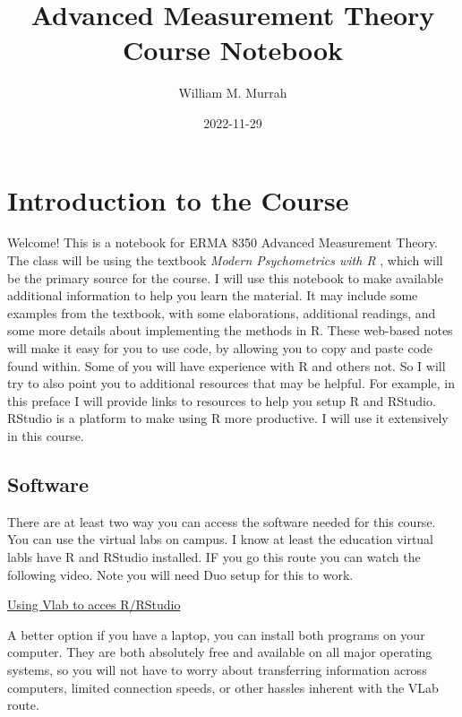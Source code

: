 \documentclass[
]{book}
\title{Advanced Measurement Theory Course Notebook}
\author{William M. Murrah}
\date{2022-11-29}
\begin{document}
\maketitle

{
\setcounter{tocdepth}{1}
\tableofcontents
}
\hypertarget{introduction-to-the-course}{%
\chapter*{Introduction to the Course}\label{introduction-to-the-course}}

Welcome!
This is a notebook for ERMA 8350 Advanced Measurement Theory.
The class will be using the textbook \emph{Modern Psychometrics with R} \citep{mair2018modern}, which will be the primary source for the course.
I will use this notebook to make available additional information to help you learn the material.
It may include some examples from the textbook, with some elaborations, additional readings, and some more details about implementing the methods in R.
These web-based notes will make it easy for you to use code, by allowing you to copy and paste code found within.
Some of you will have experience with R and others not.
So I will try to also point you to additional resources that may be helpful.
For example, in this preface I will provide links to resources to help you setup R and RStudio.
RStudio is a platform to make using R more productive.
I will use it extensively in this course.

\hypertarget{software}{%
\section*{Software}\label{software}}

There are at least two way you can access the software needed for this course.
You can use the virtual labs on campus.
I know at least the education virtual labls have R and RStudio installed.
IF you go this route you can watch the following video.
Note you will need Duo setup for this to work.

\href{https://nv.instructuremedia.com/fetch/QkFoYkIxc0hhUVNIRGFrSE1Hd3JCeWhUREdFPS0tZjk4ODFlYWEyZWFiNWQwYWYyZDk0YTZjMjljZTJlMjBkNmIwMzE5Yw.mp4}{Using Vlab to acces R/RStudio}

A better option if you have a laptop, you can install both programs on your computer.
They are both absolutely free and available on all major operating systems, so you will not have to worry about transferring information across computers, limited connection speeds, or other hassles inherent with the VLab route.
\end{document}

